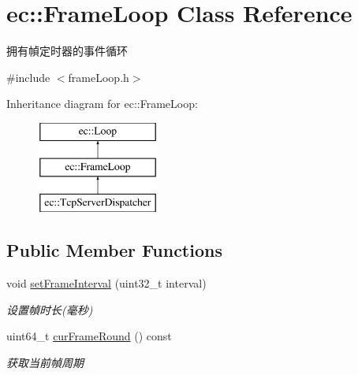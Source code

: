 \hypertarget{classec_1_1FrameLoop}{\section{ec\-:\-:Frame\-Loop Class Reference}
\label{classec_1_1FrameLoop}
}


拥有幀定时器的事件循环  




{\ttfamily \#include $<$frame\-Loop.\-h$>$}

Inheritance diagram for ec\-:\-:Frame\-Loop\-:\begin{figure}[H]
\begin{center}
\leavevmode
\includegraphics[height=3.000000cm]{classec_1_1FrameLoop}
\end{center}
\end{figure}
\subsection*{Public Member Functions}
\begin{DoxyCompactItemize}
\item 
void \hyperlink{classec_1_1FrameLoop_a95cd06861a99da652b30661e5238398c}{set\-Frame\-Interval} (uint32\-\_\-t interval)
\begin{DoxyCompactList}\small\item\em 设置幀时长(毫秒) \end{DoxyCompactList}\item 
\hypertarget{classec_1_1FrameLoop_a9390e3b33b561bd958a63059d67dd286}{uint64\-\_\-t \hyperlink{classec_1_1FrameLoop_a9390e3b33b561bd958a63059d67dd286}{cur\-Frame\-Round} () const }\label{classec_1_1FrameLoop_a9390e3b33b561bd958a63059d67dd286}

\begin{DoxyCompactList}\small\item\em 获取当前幀周期 \end{DoxyCompactList}\end{DoxyCompactItemize}
